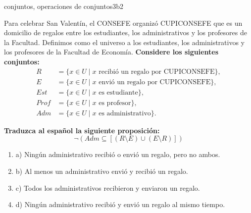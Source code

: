 \documentclass{article}
\begin{document}
\begin{question}{16}{conjuntos, operaciones de conjuntos}{3}{b}{2}{
Para celebrar San Valentín, el CONSEFE organizó CUPICONSEFE que es un domicilio de regalos entre los estudiantes, los administrativos y los profesores de la Facultad. Definimos como el universo a los estudiantes, los administrativos y los profesores de la Facultad de Economía. \textbf{Considere los siguientes conjuntos:}
\[
\begin{aligned}
R &= \{x \in U \mid x \text{ recibió un regalo por CUPICONSEFE}\},\\
E &= \{x \in U \mid x \text{ envió un regalo por CUPICONSEFE}\},\\
Est &= \{x \in U \mid x \text{ es estudiante}\},\\
Prof &= \{x \in U \mid x \text{ es profesor}\},\\
Adm &= \{x \in U \mid x \text{ es administrativo}\}.
\end{aligned}
\]

\textbf{Traduzca al español la siguiente proposición:}
\[
\neg (Adm \subseteq [(R\setminus E) \cup (E\setminus R)])
\]

\begin{enumerate}
    \item a) Ningún administrativo recibió o envió un regalo, pero no ambos.
    \item b) Al menos un administrativo envió y recibió un regalo.
    \item c) Todos los administrativos recibieron y enviaron un regalo.
    \item d) Ningún administrativo recibió y envió un regalo al mismo tiempo.
\end{enumerate}
}
\end{question}
\end{document}
